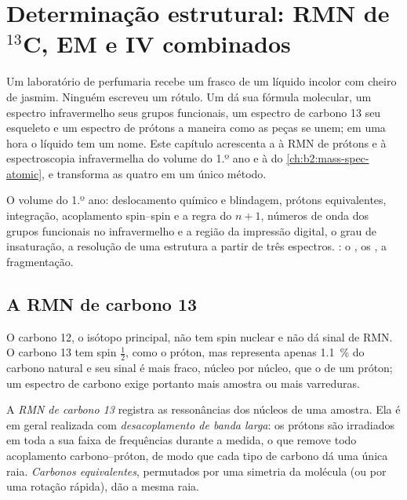 \chapter{Determinação estrutural: RMN de \texorpdfstring{$^{13}$C}{13C}, EM e IV combinados}\label{ch:b2:structure-determination}

Um laboratório de perfumaria recebe um frasco de um líquido incolor com cheiro de jasmim. Ninguém
escreveu um rótulo. Um  dá sua fórmula molecular, um espectro infravermelho seus grupos
funcionais, um espectro de carbono 13 seu esqueleto e um espectro de prótons a maneira como as peças se
unem; em uma hora o líquido tem um nome. Este capítulo acrescenta a  à RMN de prótons e
à espectroscopia infravermelha do volume do 1.º ano e à  do
\cref{ch:b2:mass-spec-atomic}, e transforma as quatro em um único método.

\begin{recall}
O volume do 1.º ano: deslocamento químico e blindagem, prótons equivalentes, integração, acoplamento
spin--spin e a regra do $n + 1$, números de onda dos grupos funcionais no infravermelho e a região da
impressão digital, o grau de insaturação, a resolução de uma estrutura a partir de três espectros.
: o , os , a fragmentação.
\end{recall}

\section{A RMN de carbono 13}

O carbono 12, o isótopo principal, não tem spin nuclear e não dá sinal de RMN. O carbono 13 tem spin
$\tfrac12$, como o próton, mas representa apenas 1.1~\% do carbono natural e seu sinal é mais fraco,
núcleo por núcleo, que o de um próton; um espectro de carbono exige portanto mais amostra ou mais
varreduras.

\begin{definition}\label{def:b2:structure-determination:c13}
A \emph{RMN de carbono 13} registra as ressonâncias dos núcleos  de uma amostra.
Ela é em geral realizada com \emph{desacoplamento de banda larga}: os prótons são
irradiados em toda a sua faixa de frequências durante a medida, o que remove todo acoplamento
carbono--próton, de modo que cada tipo de carbono dá uma única raia. \emph{Carbonos
equivalentes}, permutados por uma simetria da molécula (ou por uma rotação rápida), dão a
mesma raia.
\end{definition}

